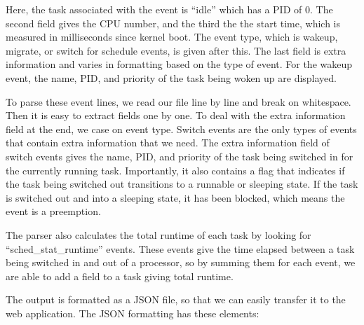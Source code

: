 \documentclass{hmcclinic}
\begin{document}
\normalsize
  Here, the task associated with the event is ``idle'' which has a PID of 0. The
  second field gives the CPU number, and the third the the start time, which
  is measured in milliseconds since kernel boot. The event type, which is 
  wakeup, migrate, or switch for schedule events, is given after this. The last
  field is extra information and varies in formatting based on the type of
  event. For the wakeup event, the name, PID, and priority of the task
  being woken up are displayed.

  To parse these event lines, we read our file line by line and break on
  whitespace. Then it is easy to extract fields one by one. To deal with the
  extra information field at the end, we case on event type. Switch events
  are the only types of events that contain extra information that we need.  The
  extra information field of switch events gives the name, PID, and priority of
  the task being switched in for the currently running task. Importantly, it
  also contains a flag that indicates if the task being switched out transitions
  to a runnable or sleeping state. If the task is switched out and into a
  sleeping state, it has been blocked, which means the event is a preemption.

  The parser also calculates the total runtime of each task by looking for
  ``sched\_stat\_runtime'' events. These events give the time elapsed between
  a task being switched in and out of a processor, so by summing them for 
  each event, we are able to add a field to a task giving total runtime.

  The output is formatted as a JSON file, so that we can easily transfer it to
  the web application. The JSON formatting has these elements:
\end{document}
